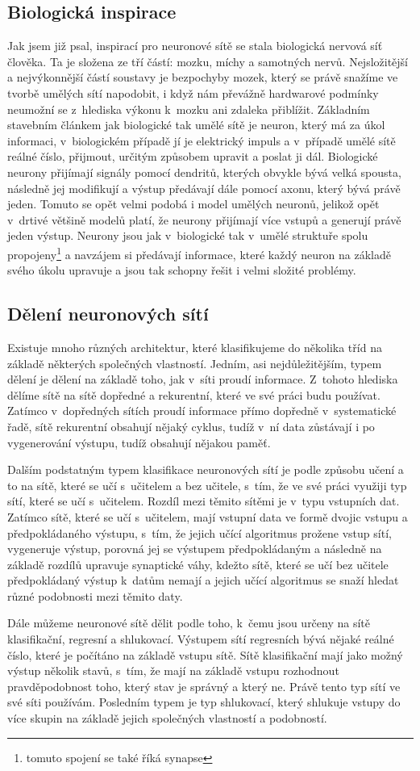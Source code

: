 \documentclass[a4paper]{article}
\begin{document}
\subsection{Biologická inspirace}
Jak jsem již psal, inspirací pro neuronové sítě se stala biologická nervová síť člověka. Ta je složena ze tří částí: mozku, míchy a samotných nervů. Nejsložitější a nejvýkonnější částí soustavy je bezpochyby mozek, který se právě snažíme ve tvorbě umělých sítí napodobit, i když nám převážně hardwarové podmínky neumožní se z~hlediska výkonu k~mozku ani zdaleka přiblížit. Základním stavebním článkem jak biologické tak umělé sítě je neuron, který má za úkol informaci, v~biologickém případě jí je elektrický impuls a v~případě umělé sítě reálné číslo, přijmout, určitým způsobem upravit a poslat ji dál. Biologické neurony přijímají signály pomocí dendritů, kterých obvykle bývá velká spousta, následně jej modifikují a výstup předávají dále pomocí axonu, který bývá právě jeden. Tomuto se opět velmi podobá i model umělých neuronů, jelikož opět v~drtivé většině modelů platí, že neurony přijímají více vstupů a generují právě jeden výstup. Neurony jsou jak v~biologické tak v~umělé struktuře spolu propojeny\footnote{tomuto spojení se také říká synapse} a navzájem si předávají informace, které každý neuron na základě svého úkolu upravuje a jsou tak schopny řešit i velmi složité problémy.
\subsection{Dělení neuronových sítí}
Existuje mnoho různých architektur, které klasifikujeme do několika tříd na základě některých společných vlastností. Jedním, asi nejdůležitějším, typem dělení je dělení na základě toho, jak v~síti proudí informace. Z~tohoto hlediska dělíme sítě na sítě dopředné a rekurentní, které ve své práci budu používat. Zatímco v~dopředných sítích proudí informace přímo dopředně v~systematické řadě, sítě rekurentní obsahují nějaký cyklus, tudíž v~ní data zůstávají i po vygenerování výstupu, tudíž obsahují nějakou paměť.\par
Dalším podstatným typem klasifikace neuronových sítí je podle způsobu učení a to na sítě, které se učí s~učitelem a bez učitele, s~tím, že ve své práci využiji typ sítí, které se učí s~učitelem. Rozdíl mezi těmito sítěmi je v~typu vstupních dat. Zatímco sítě, které se učí s~učitelem, mají vstupní data ve formě dvojic vstupu a předpokládaného výstupu, s~tím, že jejich učící algoritmus prožene vstup sítí, vygeneruje výstup, porovná jej se výstupem předpokládaným a následně na základě rozdílů upravuje synaptické váhy, kdežto sítě, které se učí bez učitele předpokládaný výstup k~datům nemají a jejich učící algoritmus se snaží hledat různé podobnosti mezi těmito daty.\par
Dále můžeme neuronové sítě dělit podle toho, k~čemu jsou určeny na sítě klasifikační, regresní a shlukovací. Výstupem sítí regresních bývá nějaké reálné číslo, které je počítáno na základě vstupu sítě. Sítě klasifikační mají jako možný výstup několik stavů, s~tím, že mají na základě vstupu rozhodnout pravděpodobnost toho, který stav je správný a který ne. Právě tento typ sítí ve své síti používám. Posledním typem je typ shlukovací, který shlukuje vstupy do více skupin na základě jejich společných vlastností a podobností.
\end{document}
